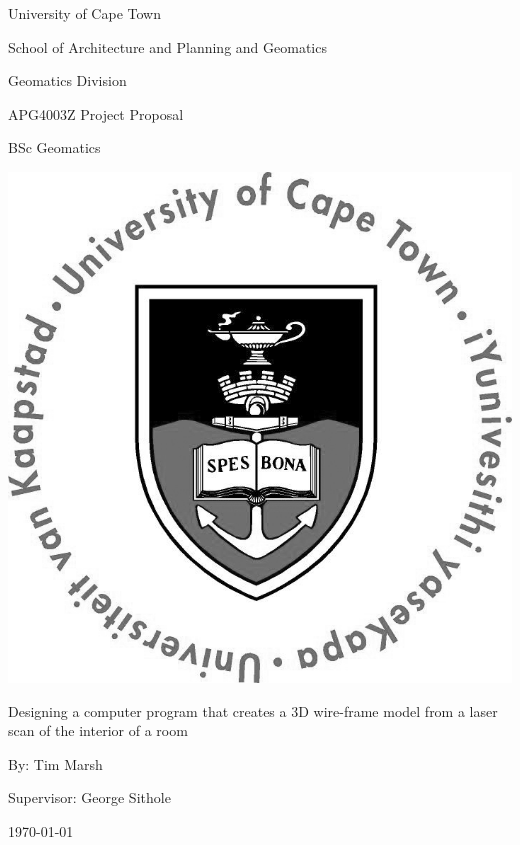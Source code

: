\begin{center}
{\Huge University of Cape Town}
\linebreak \linebreak

{\LARGE School of Architecture and Planning and Geomatics}
\linebreak \linebreak

{\Large Geomatics Division}
\linebreak \linebreak


{\Large APG4003Z Project Proposal}
\linebreak

{\Large BSc Geomatics}
\linebreak \linebreak

\begin{center}
\includegraphics[width=0.5\linewidth]{includes/images/UCTcircular_logo1_CMYK.jpg}
\linebreak \linebreak
\end{center}

{\Large Designing a computer program that creates a 3D wire-frame model from a laser scan of the interior of a room}
\linebreak \linebreak

{\Large By: Tim Marsh}
\linebreak \linebreak

{\Large Supervisor: George Sithole}
\linebreak \linebreak

{\Large \today}

\end{center}